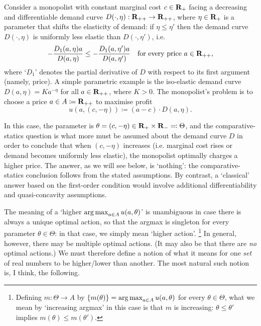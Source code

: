 \begin{example}
	\label{example:monopoly}
	Consider a monopolist with constant marginal cost $c \in \mathbf{R}_+$ facing a decreasing and differentiable demand curve $D(\cdot,\eta) : \mathbf{R}_{++} \to \mathbf{R}_{++}$, where $\eta \in \mathbf{R}_+$ is a parameter that shifts the elasticity of demand: if $\eta \leq \eta'$ then the demand curve $D(\cdot,\eta)$ is uniformly less elastic than $D(\cdot,\eta')$, i.e.
	\begin{equation*}
		- \frac{ D_1(a,\eta) a }{ D(a,\eta) }
		\leq
		- \frac{ D_1(a,\eta') a }{ D(a,\eta') }
		\quad \text{for every price $a \in \mathbf{R}_{++}$,}
	\end{equation*}
	where `$D_1$' denotes the partial derivative of $D$ with respect to its first argument (namely, price). A simple parametric example is the iso-elastic demand curve $D(a,\eta) = K a^{-\eta}$ for all $a \in \mathbf{R}_{++}$, where $K>0$.
	The monopolist's problem is to choose a price $a \in A \coloneqq \mathbf{R}_{++}$ to maximise profit
	\begin{equation*}
		u(a,(c,-\eta)) \coloneqq (a-c) \cdot D(a,\eta) .
	\end{equation*}
	
	In this case, the parameter is $\theta = (c,-\eta) \in \mathbf{R}_+ \times \mathbf{R}_- \eqqcolon \Theta$, and the comparative-statics question is what more must be assumed about the demand curve $D$ in order to conclude that when $(c,-\eta)$ increases (i.e. marginal cost rises or demand becomes uniformly less elastic), the monopolist optimally charges a higher price.
	The answer, as we will see below, is `nothing': the comparative-statics conclusion follows from the stated assumptions. By contrast, a `classical' answer based on the first-order condition would involve additional differentiability and quasi-concavity assumptions.
\end{example}

The meaning of a `higher $\operatorname*{arg\,max}_{a \in A} u(a,\theta)$' is unambiguous in case there is always a unique optimal action, so that the argmax is singleton for every parameter $\theta \in \Theta$: in that case, we simply mean `higher action'.%
	\footnote{Defining $m : \Theta \to A$ by $\{ m(\theta) \} = \operatorname*{arg\,max}_{a \in A} u(a,\theta)$ for every $\theta \in \Theta$, what we mean by `increasing argmax' in this case is that $m$ is increasing: $\theta \leq \theta'$ implies $m(\theta) \leq m(\theta')$.}
In general, however, there may be multiple optimal actions. (It may also be that there are \emph{no} optimal actions.) We must therefore define a notion of what it means for one \emph{set} of real numbers to be higher/lower than another. The most natural such notion is, I think, the following.

